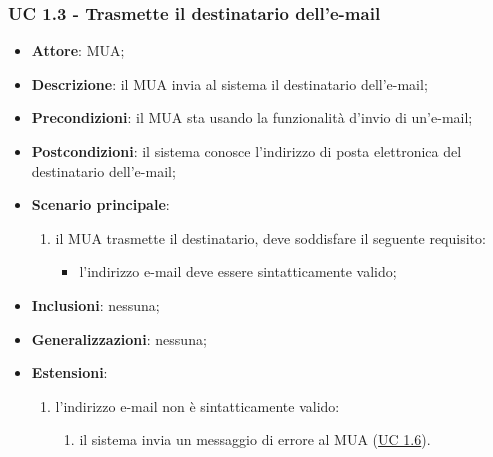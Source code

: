     \subsubsection{UC 1.3 - Trasmette il destinatario dell'e-mail} \label{sec:UC1.3}
    \begin{itemize}
        \item \textbf{Attore}: MUA;
        \item \textbf{Descrizione}: il MUA invia al sistema il destinatario dell'e-mail;
        \item \textbf{Precondizioni}: il MUA sta usando la funzionalità d'invio di un'e-mail;
        \item \textbf{Postcondizioni}: il sistema conosce l'indirizzo di posta elettronica del destinatario dell'e-mail;
        \item \textbf{Scenario principale}:
            \begin{enumerate}
                \item il MUA trasmette il destinatario, deve soddisfare il seguente requisito:
                    \begin{itemize}
                        \item l'indirizzo e-mail deve essere sintatticamente valido;
                    \end{itemize}
            \end{enumerate}
        \item \textbf{Inclusioni}: nessuna;
        \item \textbf{Generalizzazioni}: nessuna;
        \item \textbf{Estensioni}:
            \begin{enumerate}[label=\alph*.]
                \item l'indirizzo e-mail non è sintatticamente valido:
                \begin{enumerate}[label=\arabic*.]
                    \item il sistema invia un messaggio di errore al MUA (\hyperref[sec:UC1.6]{UC 1.6}).
                \end{enumerate}
            \end{enumerate}
    \end{itemize}

